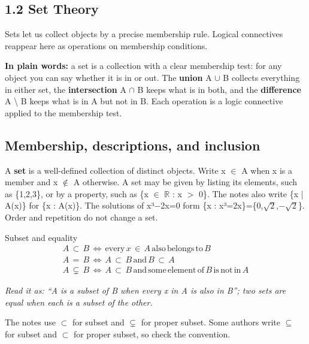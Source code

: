 \documentclass[11pt]{article}
\begin{document}
\begin{keepsection}
\section{1.2 Set Theory}

Sets let us collect objects by a precise membership rule. Logical connectives reappear here as operations on membership conditions.

\begin{plainbox}\textbf{In plain words:} a set is a collection with a clear membership test: for any object you can say whether it is in or out. The \textbf{union} A \ensuremath{\cup} B collects everything in either set, the \textbf{intersection} A \ensuremath{\cap} B keeps what is in both, and the \textbf{difference} A \textbackslash{} B keeps what is in A but not in B. Each operation is a logic connective applied to the membership test.\end{plainbox}

\begin{keepsection}
\subsection{Membership, descriptions, and inclusion}

A \textbf{set} is a well-defined collection of distinct objects. Write x \ensuremath{\in} A when x is a member and x \ensuremath{\notin} A otherwise. A set may be given by listing its elements, such as \{1,2,3\}, or by a property, such as \{x \ensuremath{\in} \ensuremath{\mathbb{R}} : x \ensuremath{>} 0\}. The notes also write \{x | A(x)\} for \{x : A(x)\}. The solutions of x³\ensuremath{-}2x=0 form \{x : x³=2x\}=\{0,\ensuremath{\sqrt{2}},\ensuremath{-}\ensuremath{\sqrt{2}}\}. Order and repetition do not change a set.

\begin{equationcard}{Subset and equality}
\[ \begin{gathered} {A}\, \subset \, {B}\, \Leftrightarrow \, \text{every}\, {x}\, \in \, {A}\, \text{also}\, \text{belongs}\, \text{to}\, {B} \\ {A}\, =\, {B}\, \Leftrightarrow \, {A}\, \subset \, {B}\, \text{and}\, {B}\, \subset \, {A} \\ {A}\, \subsetneq \, {B}\, \Leftrightarrow \, {A}\, \subset \, {B}\, \text{and}\, \text{some}\, \text{element}\, \text{of}\, {B}\, \text{is}\, \text{not}\, \text{in}\, {A} \end{gathered} \]
{\small \emph{Read it as: “A is a subset of B when every x in A is also in B”; two sets are equal when each is a subset of the other.}\par The notes use \ensuremath{\subset} for subset and \ensuremath{\subsetneq} for proper subset. Some authors write \ensuremath{\subseteq} for subset and \ensuremath{\subset} for proper subset, so check the convention.}
\end{equationcard}


\end{keepsection}
\end{keepsection}
\end{document}
